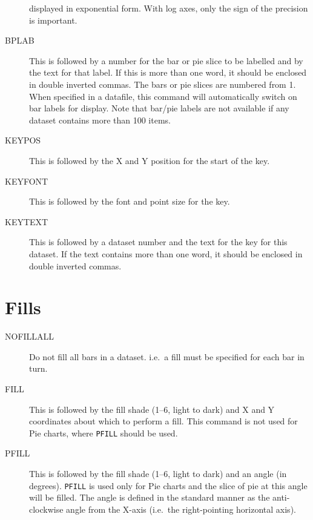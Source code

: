\documentclass{report}
\begin{document}
\begin{description}
displayed in exponential  form. With log axes, only the sign of the precision is 
important.
\item[BPLAB] This is followed by a number for the bar or pie slice to be labelled
and by the text for that label. If this is more than one word, it should be enclosed 
in double inverted commas. The bars or pie slices are numbered from 1. When 
specified in a datafile, this command will 
automatically switch on bar labels for display. Note that bar/pie labels are not 
available if any dataset contains more than 100 items.
\item[KEYPOS] This is followed by the X and Y position for the start of the key.
\item[KEYFONT] This is followed by the font and point size for the key.
\item[KEYTEXT] This is followed by a dataset number and the text for the key for 
this dataset. If the text contains more than one word, it should be enclosed 
in double inverted commas.
\end{description}

\section{Fills}
\begin{description}
\item[NOFILLALL] Do not fill all bars in a dataset. i.e.\ a fill must be 
specified for each bar in turn.
\item[FILL] This is followed by the fill shade (1--6, light to dark)
and X and Y coordinates 
about which to perform a fill. This command is not used for Pie charts, where
{\tt PFILL} should be used.
\item[PFILL] This is followed by the fill shade (1--6, light to dark)
and an angle (in degrees).
{\tt PFILL} is used only for Pie charts and the slice of pie at this angle will be 
filled. The angle is defined in the standard manner as the anti-clockwise angle
from the X-axis (i.e.\ the right-pointing  horizontal axis).
\end{description}
\end{document}
